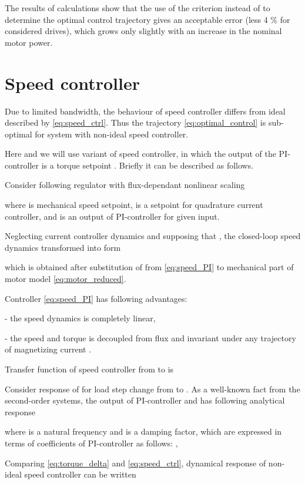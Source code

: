 \documentclass[journal]{IEEEtran}
\begin{document}
The results of calculations show that the use of the criterion  instead of  to determine the optimal control trajectory  gives an acceptable error (less 4 \% for considered drives), which grows only slightly with an increase in the nominal motor power.

\section{Speed controller}

Due to limited bandwidth, the behaviour of speed controller differs from ideal described by \eqref{eq:speed_ctrl}. Thus the trajectory \eqref{eq:optimal_control} is sub-optimal for system with non-ideal speed controller.

Here and we will use variant of speed controller, in which the output of the PI-controller is a torque setpoint \cite{11}. Briefly it can be described as follows.

Consider following regulator with flux-dependant nonlinear scaling



where  is mechanical speed setpoint,  is a setpoint for quadrature current controller, and  is an output of PI-controller for given input. 

Neglecting current controller dynamics and supposing that , the closed-loop speed dynamics transformed into form



which is obtained after substitution of  from \eqref{eq:speed_PI} to mechanical part of motor model \eqref{eq:motor_reduced}.

Controller \eqref{eq:speed_PI} has following advantages:

- the speed dynamics is completely linear,

- the speed and torque is decoupled from flux  and invariant under any trajectory of magnetizing current .

Transfer function of speed controller from  to  is



Consider response of  for load step change from  to . As a well-known fact from the second-order systems, the output of PI-controller and  has following analytical response



where  is a natural frequency and  is a damping factor, which are expressed in terms of coefficients of PI-controller as follows: 
, 

Comparing \eqref{eq:torque_delta} and \eqref{eq:speed_ctrl}, dynamical response of non-ideal speed controller can be written
\end{document}
